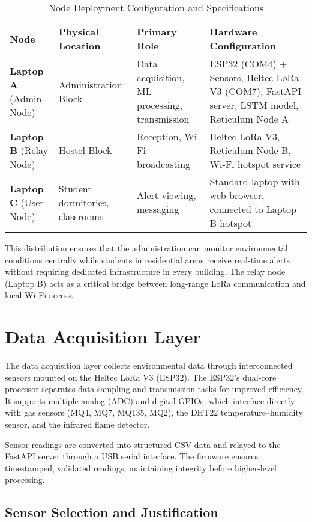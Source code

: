 \begin{table}[H]
\centering
\caption{Node Deployment Configuration and Specifications}
\label{tab:node_deployment}
\begin{tabular}{|p{2.5cm}|p{3cm}|p{4cm}|p{4.5cm}|}
\hline
\textbf{Node} & \textbf{Physical Location} & \textbf{Primary Role} & \textbf{Hardware Configuration} \\
\hline
\textbf{Laptop A} (Admin Node) & Administration Block & Data acquisition, ML processing, transmission & ESP32 (COM4) + Sensors, Heltec LoRa V3 (COM7), FastAPI server, LSTM model, Reticulum Node A \\
\hline
\textbf{Laptop B} (Relay Node) & Hostel Block & Reception, Wi-Fi broadcasting & Heltec LoRa V3, Reticulum Node B, Wi-Fi hotspot service \\
\hline
\textbf{Laptop C} (User Node) & Student dormitories, classrooms & Alert viewing, messaging & Standard laptop with web browser, connected to Laptop B hotspot \\
\hline
\end{tabular}
\end{table}

This distribution ensures that the administration can monitor environmental conditions centrally while students in residential areas receive real-time alerts without requiring dedicated infrastructure in every building. The relay node (Laptop B) acts as a critical bridge between long-range LoRa communication and local Wi-Fi access.

\section{Data Acquisition Layer}

The data acquisition layer collects environmental data through interconnected sensors mounted on the Heltec LoRa V3 (ESP32). The ESP32's dual-core processor separates data sampling and transmission tasks for improved efficiency. It supports multiple analog (ADC) and digital GPIOs, which interface directly with gas sensors (MQ4, MQ7, MQ135, MQ2), the DHT22 temperature–humidity sensor, and the infrared flame detector.

Sensor readings are converted into structured CSV data and relayed to the FastAPI server through a USB serial interface. The firmware ensures timestamped, validated readings, maintaining integrity before higher-level processing.

\subsection{Sensor Selection and Justification}

